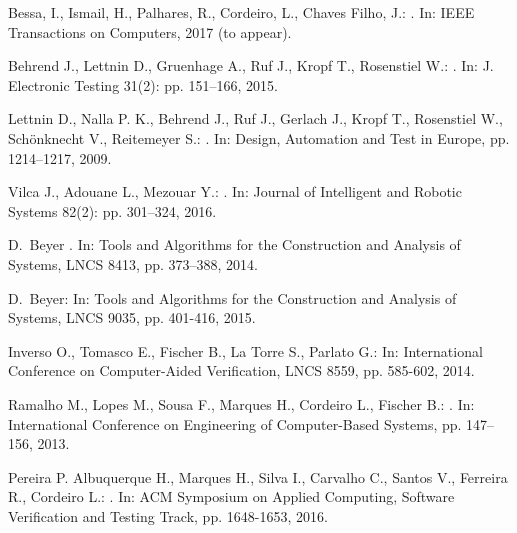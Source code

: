 \documentclass{acm_sen_article}
\begin{document}
{{\begin{thebibliography}{1}
Bessa, I., Ismail, H., Palhares, R., Cordeiro, L., Chaves Filho, J.:
. 
\newblock In: IEEE Transactions on Computers, 2017 (to appear).

Behrend J., Lettnin D., Gruenhage A., Ruf J., Kropf T., Rosenstiel W.:
. 
\newblock In: J. Electronic Testing 31(2): pp. 151--166, 2015.

Lettnin D., Nalla P. K., Behrend J., Ruf J., Gerlach J., Kropf T., Rosenstiel W., Sch{\"o}nknecht V., Reitemeyer S.:
. 
\newblock In: Design, Automation and Test in Europe, pp. 1214--1217, 2009.

Vilca J., Adouane L., Mezouar Y.:
. 
\newblock In: Journal of Intelligent and Robotic Systems 82(2): pp. 301--324, 2016.

D.~Beyer 
. 
\newblock In: Tools and Algorithms for the Construction and Analysis of Systems, LNCS 8413, pp. 373--388, 2014.
 
D.~Beyer:
\newblock In: Tools and Algorithms for the Construction and Analysis of Systems, LNCS 9035, pp. 401-416, 2015.

Inverso O., Tomasco E., Fischer B., La Torre S., Parlato G.:
\newblock In: International Conference on Computer-Aided Verification, LNCS 8559, pp. 585-602, 2014.

Ramalho M., Lopes M., Sousa F., Marques H., Cordeiro L., Fischer B.:
.
\newblock In: International Conference on Engineering of Computer-Based Systems, pp. 147--156, 2013.

Pereira P.  Albuquerque H., Marques H., Silva I., Carvalho C., Santos V., Ferreira R., Cordeiro L.: 
.
\newblock In: ACM Symposium on Applied Computing, Software Verification and Testing Track, pp. 1648-1653, 2016. 


\end{thebibliography}}}
\end{document}
